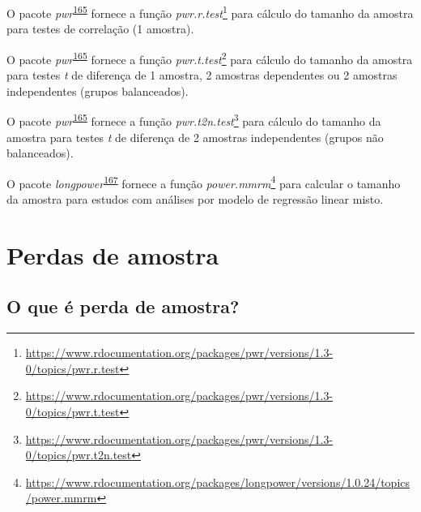 \documentclass[
  a4paper,
]{book}
\renewcommand{\href}[2]{#2\footnote{\url{#1}}}
\newenvironment{infobox}[1]
  {
  \begin{itemize}
  \renewcommand{\labelitemi}{
    \raisebox{-.7\height}[0pt][0pt]{
      {\setkeys{Gin}{width=3em,keepaspectratio}
        \texttt{[image: \#1]}}
    }
  }
  \setlength{\fboxsep}{1em}
  \begin{blackbox}
  \item
  }
  {
  \end{blackbox}
  \end{itemize}
  }
\begin{document}
\begin{infobox}{images/Rlogo}
O pacote \emph{pwr}\textsuperscript{\protect\hyperlink{ref-pwr}{165}} fornece a função \href{https://www.rdocumentation.org/packages/pwr/versions/1.3-0/topics/pwr.r.test}{\emph{pwr.r.test}} para cálculo do tamanho da amostra para testes de correlação (1 amostra).

\end{infobox}

\begin{infobox}{images/Rlogo}
O pacote \emph{pwr}\textsuperscript{\protect\hyperlink{ref-pwr}{165}} fornece a função \href{https://www.rdocumentation.org/packages/pwr/versions/1.3-0/topics/pwr.t.test}{\emph{pwr.t.test}} para cálculo do tamanho da amostra para testes \emph{t} de diferença de 1 amostra, 2 amostras dependentes ou 2 amostras independentes (grupos balanceados).

\end{infobox}

\begin{infobox}{images/Rlogo}
O pacote \emph{pwr}\textsuperscript{\protect\hyperlink{ref-pwr}{165}} fornece a função \href{https://www.rdocumentation.org/packages/pwr/versions/1.3-0/topics/pwr.t2n.test}{\emph{pwr.t2n.test}} para cálculo do tamanho da amostra para testes \emph{t} de diferença de 2 amostras independentes (grupos não balanceados).

\end{infobox}

\begin{infobox}{images/Rlogo}
O pacote \emph{longpower}\textsuperscript{\protect\hyperlink{ref-longpower}{167}} fornece a função \href{https://www.rdocumentation.org/packages/longpower/versions/1.0.24/topics/power.mmrm}{\emph{power.mmrm}} para calcular o tamanho da amostra para estudos com análises por modelo de regressão linear misto.

\end{infobox}

\hypertarget{perdas-de-amostra}{%
\section{Perdas de amostra}\label{perdas-de-amostra}}

\hypertarget{o-que-uxe9-perda-de-amostra}{%
\subsection{O que é perda de amostra?}\label{o-que-uxe9-perda-de-amostra}}
\end{document}
